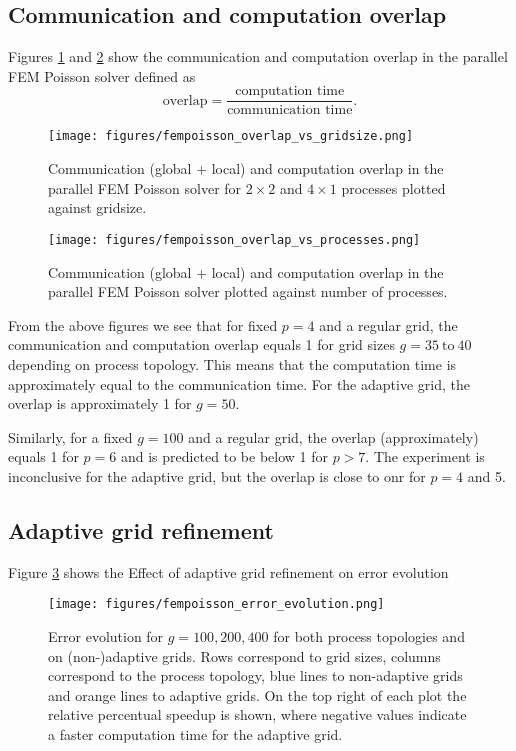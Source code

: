 \subsection{Communication and computation overlap}
Figures \ref{fig:parallel_fem_overlap_gridsize} and \ref{fig:parallel_fem_overlap_processors} show the
communication and computation overlap in the parallel FEM Poisson solver defined as
\begin{equation}
    \textrm{overlap} = \frac{\textrm{computation time}}{\textrm{communication time}}.
\end{equation}
\begin{figure}[H]
    \centering
    \texttt{[image: figures/fempoisson\_overlap\_vs\_gridsize.png]}
    \caption{
        Communication (global + local) and computation overlap in the parallel FEM Poisson solver for $2\times2$ 
        and $4\times1$ processes plotted against gridsize.}
    \label{fig:parallel_fem_overlap_gridsize}
\end{figure}
\begin{figure}[H]
    \centering
    \texttt{[image: figures/fempoisson\_overlap\_vs\_processes.png]}
    \caption{
        Communication (global + local) and computation overlap in the parallel FEM Poisson solver plotted against
        number of processes.}
    \label{fig:parallel_fem_overlap_processors}
\end{figure}
From the above figures we see that for fixed $p=4$ and a regular grid, the communication and computation overlap equals 1 for 
grid sizes $g=35\ \textrm{to}\ 40$ depending on process topology. This means that the computation time is approximately equal to the
communication time. For the adaptive grid, the overlap is approximately 1 for $g=50$.

Similarly, for a fixed $g=100$ and a regular grid, the overlap (approximately) equals 1 for $p=6$ and is 
predicted to be below 1 for $p>7$. The experiment is inconclusive for the adaptive grid, but the overlap is 
close to onr for $p=4$ and 5.

\subsection{Adaptive grid refinement}
Figure \ref{fig:parallel_fem_adaptive_refinement} shows the Effect of adaptive grid refinement on error evolution 
\begin{figure}[H]
    \centering
    \texttt{[image: figures/fempoisson\_error\_evolution.png]}
    \caption{Error evolution for $g=100,200,400$ for both process topologies and on (non-)adaptive grids.
    Rows correspond to grid sizes, columns correspond to the process topology, blue lines
    to non-adaptive grids and orange lines to adaptive grids. On the top right of each plot 
    the relative percentual speedup is shown, where negative values indicate a faster computation time
    for the adaptive grid.}
    \label{fig:parallel_fem_adaptive_refinement}
\end{figure}


